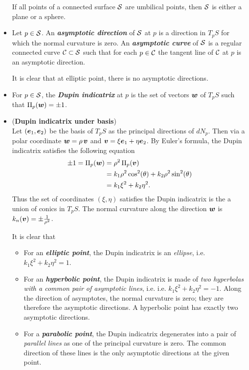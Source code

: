 \documentclass[11pt]{article}
\begin{document}
\begin{itemize}
If all points of a connected surface ${\mathcal S}$ are umbilical points, then ${\mathcal S}$ is either a plane or a sphere.

\item  \begin{definition}
Let $p\in {\mathcal S}$. An \emph{\textbf{asymptotic direction}} of ${\mathcal S}$ at $p$ is a direction in $T_{p}S$ for which the normal curvature is zero. An \emph{\textbf{asymptotic curve}} of ${\mathcal S}$ is a regular connected curve ${\mathcal C}\subset {\mathcal S}$ such that for each $p\in {\mathcal C}$ the tangent line of ${\mathcal C}$ at $p$ is an asymptotic direction. 
 \end{definition}
 
 It is clear that at elliptic point, there is no asymptotic directions. 
 
 \item For $p\in {\mathcal S}$, the \emph{\textbf{Dupin indicatrix}} at $p$ is the set of vectors $\boldsymbol{w}$ of $T_{p}S$ such that $\Pi_{p}(\boldsymbol{w}) = \pm 1$.
 
 \item  (\textbf{Dupin indicatrix under basis})\\
Let $(\boldsymbol{e}_{1}, \boldsymbol{e}_{2})$ be the basis of $T_{p}S$ as the principal directions of $dN_{p}$. Then via a polar coordinate $\boldsymbol{w} = \rho\,\boldsymbol{v}$ and $\boldsymbol{v} = \xi\boldsymbol{e}_{1}+ \eta\boldsymbol{e}_{2}$. By Euler's formula, the Dupin indicatrix satisfies the following equation
 \begin{align*}
 \pm 1 = \Pi_{p}(\boldsymbol{w}) &= \rho^{2}\,\Pi_{p}(\boldsymbol{v})\\
 &= k_{1}\rho^{2}\cos^{2}(\theta) + k_{2}\rho^{2}\sin^{2}(\theta) \\
 &= k_{1}\xi^{2} + k_{2}\eta^{2}.
 \end{align*}
Thus the set of coordinates $(\xi, \eta)$ satisfies the Dupin indicatrix is the a union of conics in $T_{p}S$. The normal curvature along the direction $\boldsymbol{w}$ is $k_{n}(\boldsymbol{v}) = \pm \frac{1}{\rho^{2}}$.

It is clear that 
\begin{itemize}
\item For an \emph{\textbf{elliptic point}}, the Dupin indicatrix is an \emph{ellipse}, i.e. $k_{1}\xi^{2} + k_{2}\eta^{2} = 1$. 
\item For an \emph{\textbf{hyperbolic point}}, the Dupin indicatrix is made of \emph{two hyperbolas with a common pair of asymptotic lines}, i.e. i.e. $k_{1}\xi^{2} + k_{2}\eta^{2} = -1$. Along the direction of asymptotes, the normal curvature is zero; they are therefore the asymptotic directions. A hyperbolic point has exactly two asymptotic directions.  
\item For a \emph{\textbf{parabolic point}}, the Dupin indicatrix degenerates into a pair of \emph{parallel lines} as one of the principal curvature is zero. The common direction of these lines is the only asymptotic directions at the given point. 
\end{itemize}


\end{itemize}
\end{document}
